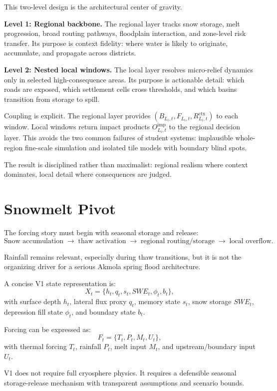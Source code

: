 \documentclass[11pt]{article}
\begin{document}
This two-level design is the architectural center of gravity.

\textbf{Level 1: Regional backbone.} The regional layer tracks snow storage, melt progression, broad routing pathways, floodplain interaction, and zone-level risk transfer. Its purpose is context fidelity: where water is likely to originate, accumulate, and propagate across districts.

\textbf{Level 2: Nested local windows.} The local layer resolves micro-relief dynamics only in selected high-consequence areas. Its purpose is actionable detail: which roads are exposed, which settlement cells cross thresholds, and which basins transition from storage to spill.

Coupling is explicit. The regional layer provides $(B_{L_i,t},F_{L_i,t},R^{\mathrm{ctx}}_{L_i,t})$ to each window. Local windows return impact products $O^{\mathrm{imp}}_{L_i,t}$ to the regional decision layer. This avoids the two common failures of student systems: implausible whole-region fine-scale simulation and isolated tile models with boundary blind spots.

The result is disciplined rather than maximalist: regional realism where context dominates, local detail where consequences are judged.

\section{Snowmelt Pivot}

The forcing story must begin with seasonal storage and release:
\[
\text{Snow accumulation} \;\rightarrow\; \text{thaw activation} \;\rightarrow\; \text{regional routing/storage} \;\rightarrow\; \text{local overflow}.
\]

Rainfall remains relevant, especially during thaw transitions, but it is not the organizing driver for a serious Akmola spring flood architecture.

A concise V1 state representation is:
\[
X_t=\{h_t,q_t,s_t,SWE_t,\phi_t,b_t\},
\]
with surface depth $h_t$, lateral flux proxy $q_t$, memory state $s_t$, snow storage $SWE_t$, depression fill state $\phi_t$, and boundary state $b_t$.

Forcing can be expressed as:
\[
F_t=\{T_t,P_t,M_t,U_t\},
\]
with thermal forcing $T_t$, rainfall $P_t$, melt input $M_t$, and upstream/boundary input $U_t$.

V1 does not require full cryosphere physics. It requires a defensible seasonal storage-release mechanism with transparent assumptions and scenario bounds.
\end{document}
